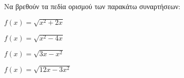 Να βρεθούν τα πεδία ορισμού των παρακάτω συναρτήσεων:
\begin{alist}
\item $ f(x)=\sqrt{x^2+2x} $
\item $ f(x)=\sqrt{x^2-4x} $
\item $ f(x)=\sqrt{3x-x^2} $
\item $ f(x)=\sqrt{12x-3x^2} $
\end{alist}
